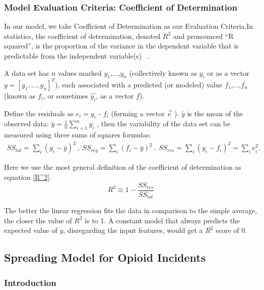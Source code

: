 \documentclass{mcmthesis}
\begin{document}
\subsubsection{Model Evaluation Criteria:  Coefficient of Determination}
    
    In our model, we take  Coefficient of Determination as our Evaluation Criteria.In statistics, the coefficient of determination, denoted $R^2$ and pronounced ``R squared'', is the proportion of the variance in the dependent variable that is predictable from the independent variable(s) ~\cite{R}. 
    
    A data set has $n$ values marked $y_1$,...,$y_n$ (collectively known as $y_i$ or as a vector $y = [y_1,...,y_n]^T$), each associated with a predicted (or modeled) value $f_1$,...,$f_n$ (known as $f_i$, or sometimes $\hat{y_i}$, as a vector $f$).

    Define the residuals as $e_i = y_i$ - $f_i$ (forming a vector $\vec{e}$ ). $\bar{y}$ is the mean of the observed data: 
    $\bar{y}=\frac{1}{n}\sum_{i=1}^n y_{i}$ , then the variability of the data set can be measured using three sums of squares formulas:
    \begin{gather*}
        SS_{tot}=\sum _{i} \left ( y_i-\bar{y} \right )^2 ~,~
         SS_{reg}=\sum _{i} \left ( f_i-\bar{y} \right )^2 ~,~
       SS_{res}=\sum _{i} \left ( y_i-f_i \right )^2=\sum _{i}e_i^2.
     \end{gather*}
     
    Here we use the most general definition of the coefficient of determination as equation \ref{R^2}.
    \begin{equation}\label{R^2}
        R^2\equiv 1-\frac{SS_{res}}{SS_{tot}}
    \end{equation}
    
   The better the linear regression fits the data in comparison to the simple average, the closer the value of $R^{2}$ is to 1. A constant model that always predicts the expected value of $y$, disregarding the input features, would get a $R^2$ score of 0.

\subsection{ Spreading Model for Opioid Incidents }

\subsubsection{Introduction}    
\end{document}
